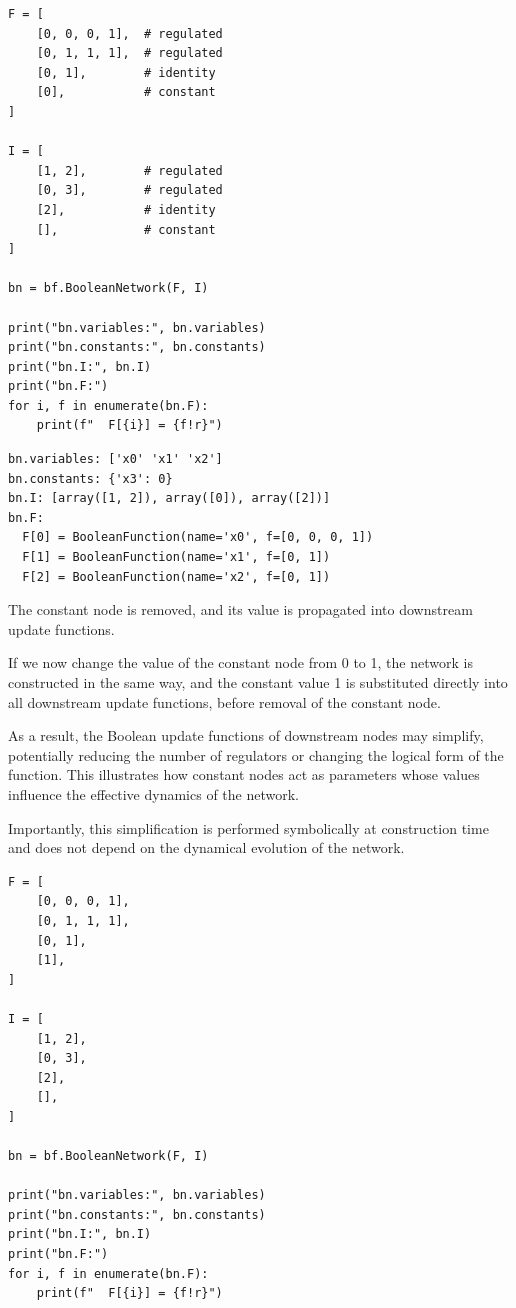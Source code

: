\documentclass[
]{article}
\begin{document}
\begin{lstlisting}
F = [
    [0, 0, 0, 1],  # regulated
    [0, 1, 1, 1],  # regulated
    [0, 1],        # identity
    [0],           # constant
]

I = [
    [1, 2],        # regulated
    [0, 3],        # regulated
    [2],           # identity
    [],            # constant
]

bn = bf.BooleanNetwork(F, I)

print("bn.variables:", bn.variables)
print("bn.constants:", bn.constants)
print("bn.I:", bn.I)
print("bn.F:")
for i, f in enumerate(bn.F):
    print(f"  F[{i}] = {f!r}")
\end{lstlisting}

\begin{lstlisting}
bn.variables: ['x0' 'x1' 'x2']
bn.constants: {'x3': 0}
bn.I: [array([1, 2]), array([0]), array([2])]
bn.F:
  F[0] = BooleanFunction(name='x0', f=[0, 0, 0, 1])
  F[1] = BooleanFunction(name='x1', f=[0, 1])
  F[2] = BooleanFunction(name='x2', f=[0, 1])
\end{lstlisting}

The constant node is removed, and its value is propagated into
downstream update functions.

If we now change the value of the constant node from 0 to 1, the network
is constructed in the same way, and the constant value 1 is substituted
directly into all downstream update functions, before removal of the
constant node.

As a result, the Boolean update functions of downstream nodes may
simplify, potentially reducing the number of regulators or changing the
logical form of the function. This illustrates how constant nodes act as
parameters whose values influence the effective dynamics of the network.

Importantly, this simplification is performed symbolically at
construction time and does not depend on the dynamical evolution of the
network.

\begin{lstlisting}
F = [
    [0, 0, 0, 1],
    [0, 1, 1, 1],
    [0, 1],
    [1],
]

I = [
    [1, 2],
    [0, 3],
    [2],
    [],
]

bn = bf.BooleanNetwork(F, I)

print("bn.variables:", bn.variables)
print("bn.constants:", bn.constants)
print("bn.I:", bn.I)
print("bn.F:")
for i, f in enumerate(bn.F):
    print(f"  F[{i}] = {f!r}")
\end{lstlisting}
\end{document}
